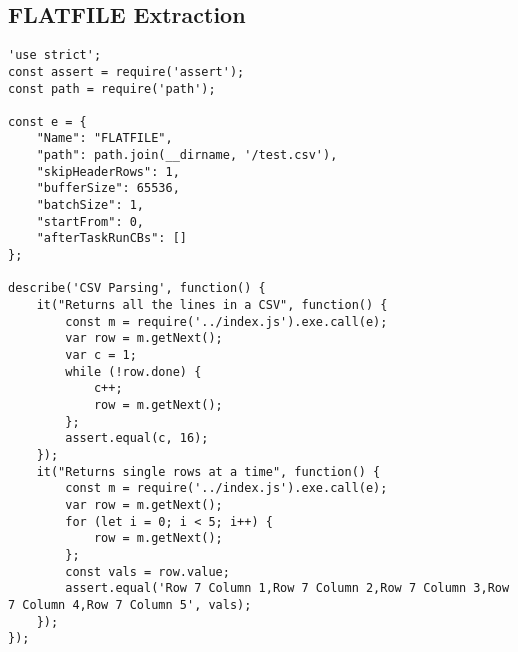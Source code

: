 \subsection{FLATFILE Extraction}
\label{FLATFILE-tests}
\begin{verbatim}
'use strict';
const assert = require('assert');
const path = require('path');

const e = {
    "Name": "FLATFILE",
    "path": path.join(__dirname, '/test.csv'),
    "skipHeaderRows": 1,
    "bufferSize": 65536,
    "batchSize": 1,
    "startFrom": 0,
    "afterTaskRunCBs": []
};

describe('CSV Parsing', function() {
    it("Returns all the lines in a CSV", function() {
        const m = require('../index.js').exe.call(e);
        var row = m.getNext();
        var c = 1;
        while (!row.done) {
            c++;
            row = m.getNext();
        };
        assert.equal(c, 16);
    });
    it("Returns single rows at a time", function() {
        const m = require('../index.js').exe.call(e);
        var row = m.getNext();
        for (let i = 0; i < 5; i++) {
            row = m.getNext();
        };
        const vals = row.value;
        assert.equal('Row 7 Column 1,Row 7 Column 2,Row 7 Column 3,Row 7 Column 4,Row 7 Column 5', vals);
    });
});
\end{verbatim}